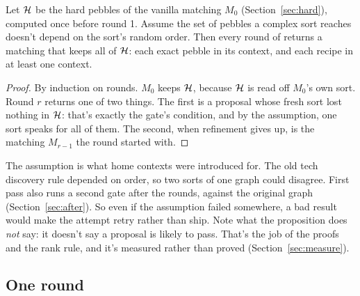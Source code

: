 \begin{proposition}
\label{prop:invariant}
Let $\mathcal{H}$ be the hard pebbles of the vanilla matching $M_0$ (Section~\ref{sec:hard}), computed once before round 1. Assume the set of pebbles a complex sort reaches doesn't depend on the sort's random order. Then every round of  returns a matching that keeps all of $\mathcal{H}$: each exact pebble in its context, and each recipe in at least one context.
\end{proposition}
\begin{proof}
By induction on rounds. $M_0$ keeps $\mathcal{H}$, because $\mathcal{H}$ is read off $M_0$'s own sort. Round $r$ returns one of two things. The first is a proposal whose fresh sort lost nothing in $\mathcal{H}$: that's exactly the gate's condition, and by the assumption, one sort speaks for all of them. The second, when refinement gives up, is the matching $M_{r-1}$ the round started with.
\end{proof}

\noindent The assumption is what home contexts were introduced for. The old tech discovery rule depended on order, so two sorts of one graph could disagree. First pass also runs a second gate after the rounds, against the original graph (Section~\ref{sec:after}). So even if the assumption failed somewhere, a bad result would make the attempt retry rather than ship. Note what the proposition does \emph{not} say: it doesn't say a proposal is likely to pass. That's the job of the proofs and the rank rule, and it's measured rather than proved (Section~\ref{sec:measure}).

\subsection{One round}

